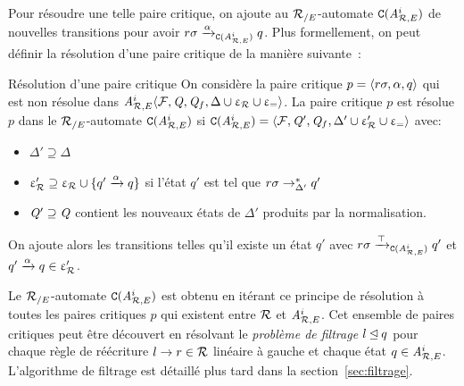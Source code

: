 Pour résoudre une telle paire critique, on ajoute au ${\mathcal R_{/E}}$-automate $\mathtt{C}({\mathit A}_{\mathcal R,E}^i)$
de nouvelles transitions pour avoir $r\sigma \xrightarrow{\alpha}_{\mathtt{C}({\mathit A}_{\mathcal R,E}^{i})} q$.
Plus formellement, on peut définir la résolution d'une paire critique de la manière suivante~:

\begin{definition}{Résolution d'une paire critique}
  \label{def:resolution_cp}
  On considère la paire critique $p=\langle r\sigma, \alpha, q \rangle$ qui est non résolue dans
  ${\mathit A}_{\mathcal R,E}^i \langle \mathcal{F}, \mathit Q, \mathit Q_f, \Delta\cup \upvarepsilon_{\mathcal R}\cup \upvarepsilon_{=} \rangle$.
  La paire critique $p$ est résolue $p$ dans le ${\mathcal R_{/E}}$-automate $\mathtt{C}({\mathit A}_{\mathcal R,E}^i)$
  si $\mathtt{C}({\mathit A}_{\mathcal R,E}^i) = \langle \mathcal{F}, \mathit Q', \mathit Q_f, \Delta'\cup \upvarepsilon_{\mathcal R}'\cup \upvarepsilon_{=} \rangle$ avec:
  \begin{itemize}
  \item $\Delta'\supseteq \Delta$%
  \item $\upvarepsilon_{\mathcal R}'\supseteq \upvarepsilon_{\mathcal R} \cup \{q' \xrightarrow{\alpha} q\}$ si l'état $q'$ est tel que $r\sigma \rightarrow^*_{\Delta'} q'$
  \item $\mathit Q' \supseteq \mathit Q$ contient les nouveaux états de $\Delta'$ produits par la normalisation.
  \end{itemize}
\end{definition}

On ajoute alors les transitions telles qu'il existe un état $q'$ avec
$r\sigma \xrightarrow{\top}_{\mathtt{C}({\mathit A}_{\mathcal R,E}^i)} q'$ et $q'\xrightarrow{\alpha} q \in \upvarepsilon_{\mathcal R}'$. 

Le ${\mathcal R_{/E}}$-automate $\mathtt{C}({\mathit A}_{\mathcal R,E}^i)$ est obtenu en itérant ce
principe de résolution à toutes les paires critiques $p$ qui existent
entre $\mathcal R$ et ${\mathit A}_{\mathcal R,E}^i$. Cet ensemble de paires critiques peut être découvert
en résolvant le {\em problème de filtrage} $l \unlhd q$ pour chaque règle de
réécriture $l \rightarrow r\in \mathcal R$ linéaire à gauche et chaque état $q\in{\mathit A}_{\mathcal R,E}^i$.
L'algorithme de filtrage est détaillé plus tard dans la section~\ref{sec:filtrage}.


